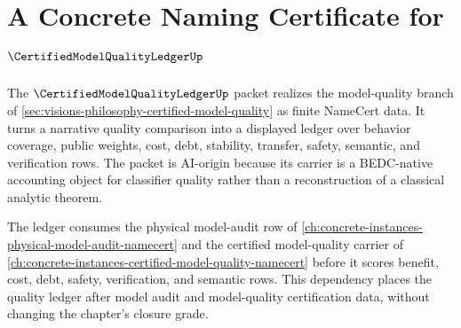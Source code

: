 \chapter{A Concrete Naming Certificate for $\CertifiedModelQualityLedgerUp$}
\label{ch:concrete-instances-certified-model-quality-ledger-namecert}

The $\CertifiedModelQualityLedgerUp$ packet realizes the model-quality branch of \autoref{sec:visions-philosophy-certified-model-quality} as finite NameCert data. It turns a narrative quality comparison into a displayed ledger over behavior coverage, public weights, cost, debt, stability, transfer, safety, semantic, and verification rows. The packet is AI-origin because its carrier is a BEDC-native accounting object for classifier quality rather than a reconstruction of a classical analytic theorem.

The ledger consumes the physical model-audit row of \autoref{ch:concrete-instances-physical-model-audit-namecert} and the certified model-quality carrier of \autoref{ch:concrete-instances-certified-model-quality-namecert} before it scores benefit, cost, debt, safety, verification, and semantic rows. This dependency places the quality ledger after model audit and model-quality certification data, without changing the chapter's closure grade.

